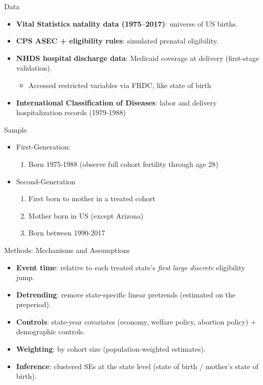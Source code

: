 \documentclass{beamer}
\begin{document}
\begin{frame}{Data}
\begin{itemize}
  \item \textbf{Vital Statistics natality data (1975–2017)}: universe of US births.
  \item \textbf{CPS ASEC + eligibility rules}: simulated prenatal eligibility.
  \item \textbf{NHDS hospital discharge data}: Medicaid coverage at delivery (first-stage validation).
  \begin{itemize}
    \item Accessed restricted variables via FRDC, like state of birth
  \end{itemize}
  \item \textbf{International Classification of Diseases}: labor and delivery hospitalization records (1979-1988) 
\end{itemize}
\end{frame}

\begin{frame}{Sample}
  \begin{itemize}
    \item First-Generation:
    \begin{enumerate}
      \item Born 1975-1988 (observe full cohort fertility through age 28)
    \end{enumerate}
    \item Second-Generation
    \begin{enumerate}
      \item First born to mother in a treated cohort
      \item Mother born in US (except Arizona)
      \item Born between 1990-2017
    \end{enumerate}
  \end{itemize}
\end{frame}

\begin{frame}{Methods: Mechanisms and Assumptions}
\begin{itemize}
  \item \textbf{Event time}: relative to each treated state's \emph{first large discrete} eligibility jump.
  \item \textbf{Detrending}: remove state-specific linear pretrends (estimated on the preperiod).
  \item \textbf{Controls}: state-year covariates (economy, welfare policy, abortion policy) + demographic controls.
  \item \textbf{Weighting}: by cohort size (population-weighted estimates).
  \item \textbf{Inference}: clustered SEs at the state level (state of birth / mother's state of birth).
\end{itemize}
\end{frame}
\end{document}
